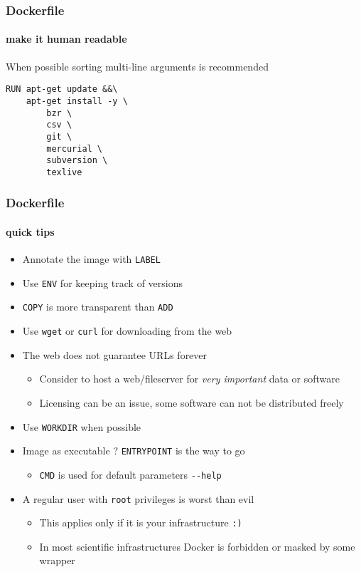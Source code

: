 \begin{frame}[fragile]
\frametitle{Dockerfile}
\framesubtitle{make it human readable}

When possible sorting multi-line arguments is recommended

\begin{lstlisting}
RUN apt-get update &&\
    apt-get install -y \
		bzr \
		csv \
		git \
		mercurial \
		subversion \
		texlive
\end{lstlisting}
\end{frame}


\begin{frame}[fragile]
\frametitle{Dockerfile}
\framesubtitle{quick tips}

\begin{itemize}
\item Annotate the image with \lstinline!LABEL!
\item Use \lstinline!ENV! for keeping track of versions
\item \lstinline!COPY! is more transparent than \lstinline!ADD!
\item Use \lstinline!wget! or \lstinline!curl! for downloading from the web
\item The web does not guarantee URLs forever
  \begin{itemize}
  \item Consider to host a web/fileserver for \textit{very important} data or software
  \item Licensing can be an issue, some software can not be distributed freely
  \end{itemize}
\item Use \lstinline!WORKDIR! when possible
\item Image as executable ? \lstinline!ENTRYPOINT! is the way to go
  \begin{itemize}
  \item \lstinline!CMD! is used for default parameters \lstinline!--help!
  \end{itemize}
\item A regular user with \lstinline!root! privileges is worst than evil
  \begin{itemize}
  \item This applies only if it is your infrastructure \lstinline!:)!
  \item In most scientific infrastructures Docker is forbidden or masked by some wrapper
  \end{itemize}
\end{itemize}
\end{frame}
 

